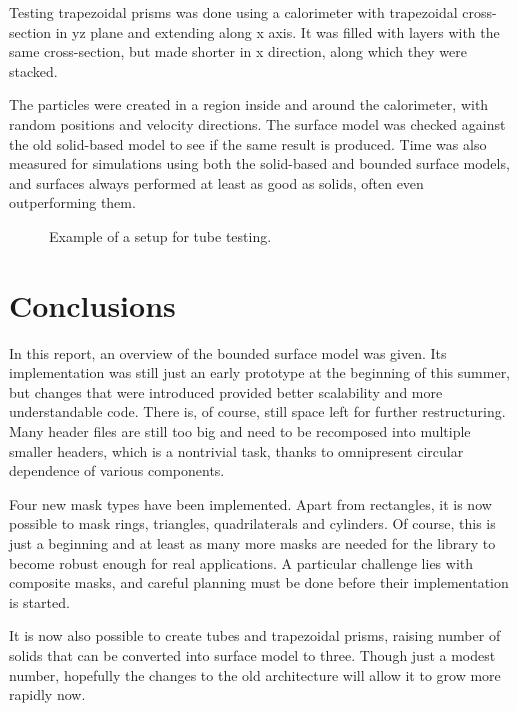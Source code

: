 \documentclass[12pt, a4paper]{article}
\begin{document}
Testing trapezoidal prisms was done using a calorimeter with trapezoidal cross-section in yz plane and extending along x axis. It was filled with layers with the same cross-section, but made shorter in x direction, along which they were stacked.

The particles were created in a region inside and around the calorimeter, with random positions and velocity directions. The surface model was checked against the old solid-based model to see if the same result is produced. Time was also measured for simulations using both the solid-based and bounded surface models, and surfaces always performed at least as good as solids, often even outperforming them.

\begin{figure}[h]
\begin{minipage}{0.45\textwidth}
		\centering
		
\end{minipage}
\begin{minipage}{0.45\textwidth}
	\centering
	
\end{minipage}
\caption{Example of a setup for tube testing.}
\label{fig:testTubes}
\end{figure}


\section{Conclusions}

 In this report, an overview of the bounded surface model was given. Its implementation was still just an early prototype at the beginning of this summer, but changes that were introduced provided better scalability and more understandable code. There is, of course, still space left for further restructuring. Many header files are still too big and need to be recomposed into multiple smaller headers, which is a nontrivial task, thanks to omnipresent circular dependence of various components.
 
 Four new mask types have been implemented. Apart from rectangles, it is now possible to mask rings, triangles, quadrilaterals and cylinders. Of course, this is just a beginning and at least as many more masks are needed for the library to become robust enough for real applications. A particular challenge lies with composite masks, and careful planning must be done before their implementation is started.
 
 It is now also possible to create tubes and trapezoidal prisms, raising number of solids that can be converted into surface model to three. Though just a modest number, hopefully the changes to the old architecture will allow it to grow more rapidly now.
 
\end{document}

